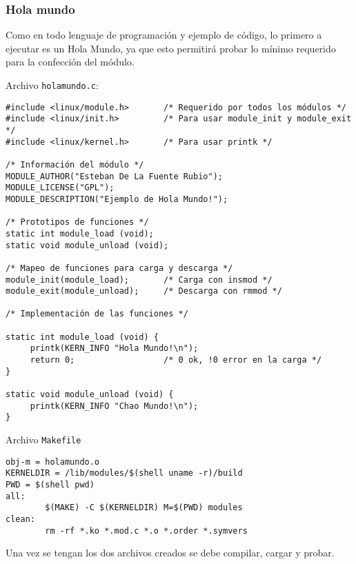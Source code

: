 \subsubsection{Hola mundo}

Como en todo lenguaje de programación y ejemplo de código, lo primero a ejecutar es un Hola Mundo, ya que esto permitirá probar lo mínimo requerido para la confección del módulo.

Archivo \texttt{holamundo.c}:
\begin{verbatim}
#include <linux/module.h>       /* Requerido por todos los módulos */
#include <linux/init.h>         /* Para usar module_init y module_exit */
#include <linux/kernel.h>       /* Para usar printk */

/* Información del módulo */
MODULE_AUTHOR("Esteban De La Fuente Rubio");
MODULE_LICENSE("GPL");
MODULE_DESCRIPTION("Ejemplo de Hola Mundo!");

/* Prototipos de funciones */
static int module_load (void);
static void module_unload (void);

/* Mapeo de funciones para carga y descarga */
module_init(module_load);       /* Carga con insmod */
module_exit(module_unload);     /* Descarga con rmmod */

/* Implementación de las funciones */

static int module_load (void) {
     printk(KERN_INFO "Hola Mundo!\n");
     return 0;                  /* 0 ok, !0 error en la carga */
}

static void module_unload (void) {
     printk(KERN_INFO "Chao Mundo!\n");
}
\end{verbatim}

Archivo \texttt{Makefile}
\begin{verbatim}
obj-m = holamundo.o
KERNELDIR = /lib/modules/$(shell uname -r)/build
PWD = $(shell pwd)
all:
        $(MAKE) -C $(KERNELDIR) M=$(PWD) modules
clean:
        rm -rf *.ko *.mod.c *.o *.order *.symvers
\end{verbatim}

Una vez se tengan los dos archivos creados se debe compilar, cargar y probar.

